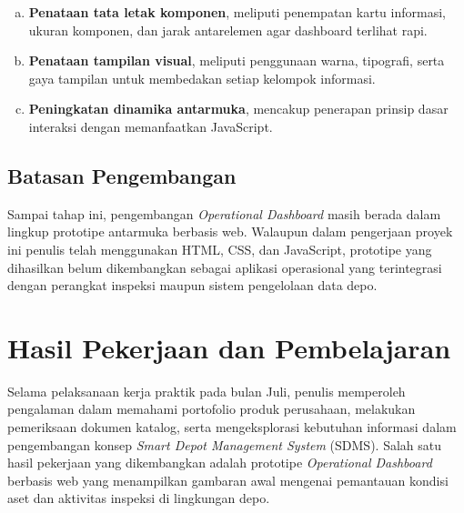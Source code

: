 \begin{enumerate}[a.]
    \item \textbf{Penataan tata letak komponen}, meliputi penempatan kartu informasi, ukuran komponen, dan jarak antarelemen agar dashboard terlihat rapi.
    \item \textbf{Penataan tampilan visual}, meliputi penggunaan warna, tipografi, serta gaya tampilan untuk membedakan setiap kelompok informasi.
    \item \textbf{Peningkatan dinamika antarmuka}, mencakup penerapan prinsip dasar interaksi dengan memanfaatkan JavaScript.
\end{enumerate}

\subsection{Batasan Pengembangan}
Sampai tahap ini, pengembangan \textit{Operational Dashboard} masih berada dalam lingkup prototipe antarmuka berbasis web. Walaupun dalam pengerjaan proyek ini penulis telah menggunakan HTML, CSS, dan JavaScript, prototipe yang dihasilkan belum dikembangkan sebagai aplikasi operasional yang terintegrasi dengan perangkat inspeksi maupun sistem pengelolaan data depo.

\section{Hasil Pekerjaan dan Pembelajaran}
Selama pelaksanaan kerja praktik pada bulan Juli, penulis memperoleh pengalaman dalam memahami portofolio produk perusahaan, melakukan pemeriksaan dokumen katalog, serta mengeksplorasi kebutuhan informasi dalam pengembangan konsep \textit{Smart Depot Management System} (SDMS). Salah satu hasil pekerjaan yang dikembangkan adalah prototipe \textit{Operational Dashboard} berbasis web yang menampilkan gambaran awal mengenai pemantauan kondisi aset dan aktivitas inspeksi di lingkungan depo.
